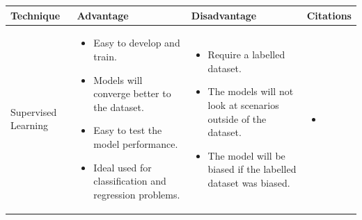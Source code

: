 \begin{longtable}{| p{23mm} | p{46mm} | p{42mm} | p{38mm} |}
\hline
    \textbf{Technique} &
    \textbf{Advantage} &
    \textbf{Disadvantage} &
    \textbf{Citations} \\ \hline
    
    Supervised Learning &
    \vspace{-8mm}
    \begin{itemize}[leftmargin=0mm,noitemsep,nolistsep,label={}] 
        \item Easy to develop and train.
        \item Models will converge better to the dataset.
        \item Easy to test the model performance.
        \item Ideal used for classification and regression problems.
        \vspace{-7mm}
    \end{itemize} &
    \vspace{-8mm}
    \begin{itemize}[leftmargin=0mm,noitemsep,nolistsep,label={}] 
            \item Require a labelled dataset.
            \item The models will not look at scenarios outside of the dataset. 
            \item The model will be biased if the labelled dataset was biased.
            \vspace{-7mm}
    \end{itemize} &
    \vspace{-8mm}
    \begin{itemize}[leftmargin=0mm,noitemsep,nolistsep,label={}] 
        \item \cite{du2018anomaly}
        \vspace{-7mm}
    \end{itemize} \\ \hline
    

\end{longtable}
